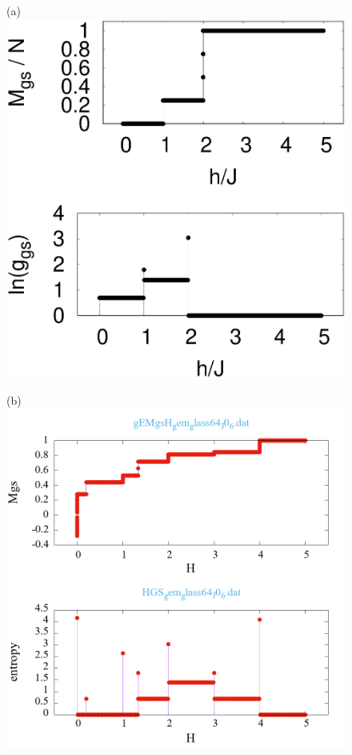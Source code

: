 \documentclass[preprint,12pt]{elsarticle}
\begin{document}
\begin{figure}[H]
	\begin{minipage}[h]{0.32\linewidth}
		\centering(a)
		\includegraphics[width=1\linewidth]{pictures/_multiplot_SI64_J0_1}
	\end{minipage}
	\hfill
	\begin{minipage}[h]{0.32\linewidth}
		\centering(b)
		\includegraphics[width=1\linewidth]{pictures/_multiplot_SG64_J0}

\end{minipage}
\end{figure}
\end{document}
